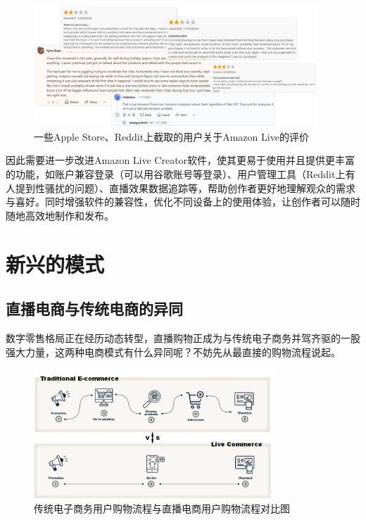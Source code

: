 \documentclass[12pt]{ctexart}
\begin{document}
\begin{itemize}
    \begin{figure}[htbp!]
        \centering
        \includegraphics[width=0.95\textwidth]{Images/9.png}
        \caption{一些Apple Store、Reddit上截取的用户关于Amazon Live的评价}
        \label{comment}
    \end{figure}
    
    因此需要进一步改进Amazon Live Creator软件，使其更易于使用并且提供更丰富的功能，如账户兼容登录（可以用谷歌账号等登录）、用户管理工具（Reddit上有人提到性骚扰的问题）、直播效果数据追踪等，帮助创作者更好地理解观众的需求与喜好。同时增强软件的兼容性，优化不同设备上的使用体验，让创作者可以随时随地高效地制作和发布。
    
\end{itemize}

\section{新兴的模式}

\subsection{直播电商与传统电商的异同}
数字零售格局正在经历动态转型，直播购物正成为与传统电子商务并驾齐驱的一股强大力量\cite{16}，这两种电商模式有什么异同呢？不妨先从最直接的购物流程说起。

\begin{figure}[htbp!]
    \centering
    \includegraphics[width=0.8\textwidth]{Images/10.png}
    \caption{传统电子商务用户购物流程与直播电商用户购物流程对比图\cite{16}}
    \label{flow}
\end{figure}
\end{document}
